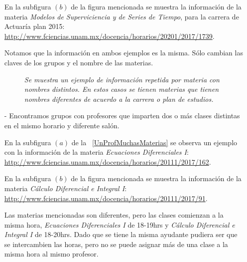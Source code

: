 \begin{itemize}
En la subfigura $(b)$ de la figura mencionada se muestra la información de la materia \textit{Modelos de Superviciencia y de Series de Tiempo}, para la carrera de Actuaría plan 2015: \url{http://www.fciencias.unam.mx/docencia/horarios/20201/2017/1739}.

Notamos que la información en ambos ejemplos es la misma. Sólo cambian las claves de los grupos y el nombre de las materias.

\begin{figure}[H]
	\centering
	\caption[\textit{Ejemplo de información repetida: Materia con nombres distintos}]{\textit{Se muestra un ejemplo de información repetida por materia con nombres distintos. En estos casos se tienen materias que tienen nombres diferentes de acuerdo a la carrera o plan de estudios.}}\label{MateriaNombresDistintos}
\end{figure}

\item[-] Encontramos grupos con profesores que imparten dos o más clases distintas en el mismo horario y diferente salón.

En la subfigura $(a)$ de la \figurename{~\ref{UnProfMuchasMaterias}} se observa un ejemplo con la información de la materia \textit{Ecuaciones Diferenciales I}: \url{http://www.fciencias.unam.mx/docencia/horarios/20111/2017/162}.

En la subfigura $(b)$ de la figura mencionada se muestra la información de la materia \textit{Cálculo Diferencial e Integral I}: \url{http://www.fciencias.unam.mx/docencia/horarios/20111/2017/91}.

Las materias mencionadas son diferentes, pero las clases comienzan a la misma hora, \textit{Ecuaciones Diferenciales I} de 18-19hrs y \textit{Cálculo Diferencial e Integral I} de 18-20hrs. Dado que se tiene la misma ayudante pudiera ser que se intercambien las horas, pero no se puede asignar más de una clase a la misma hora al mismo profesor.



\end{itemize}
